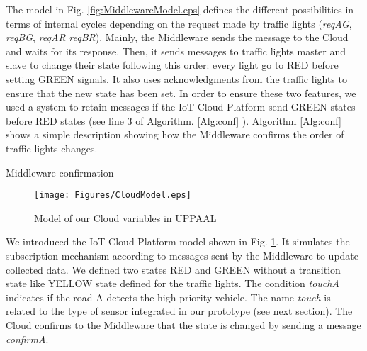 

The model in Fig. \ref{fig:MiddlewareModel.eps} defines the different possibilities in terms of internal cycles depending on the request made by traffic lights (\emph{reqAG}, \emph{reqBG}, \emph{reqAR} \emph{reqBR}). Mainly, the Middleware sends the message to the Cloud and waits for its response. Then, it sends messages to traffic lights master and slave to change their state following this order: every light go to RED before setting GREEN signals. It also uses acknowledgments from the traffic lights to ensure that the new state has been set. In order to ensure these two features, we used a system to retain messages if the IoT Cloud Platform send GREEN states before RED states (see line 3 of Algorithm. \ref{Alg:conf} ). Algorithm \ref{Alg:conf} shows a simple description showing how the Middleware confirms the order of traffic lights changes.



\LinesNumbered \begin{algorithm}[ht] \caption{Middleware confirmation\label{Alg:conf}}
\end{algorithm}
\begin{figure}[!htb]
\centering
\texttt{[image: Figures/CloudModel.eps]}
\caption{Model of our Cloud variables in UPPAAL}
\label{fig:CloudModel.eps}
\end{figure}


We introduced the IoT Cloud Platform model shown in Fig. \ref{fig:CloudModel.eps}. It simulates the subscription mechanism according to messages sent by the Middleware to update collected data. We defined two states RED and GREEN without a transition state like YELLOW state defined for the traffic lights. The condition \emph{touchA} indicates if the road A detects the high priority vehicle. The name \emph{touch} is related to the type of sensor integrated in our prototype (see next section). The Cloud confirms to the Middleware that the state is changed by sending a message \emph{confirmA}. 

